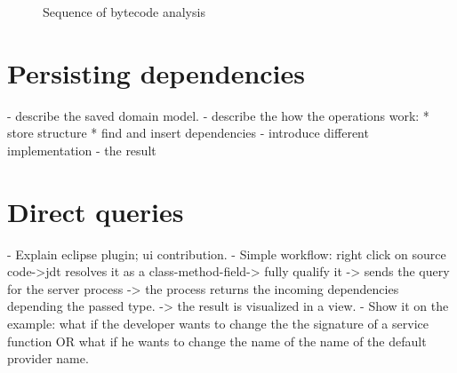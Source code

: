 \begin{figure}[htb]
   \center   
   \caption{Sequence of bytecode analysis} 
   \label{fig:analization.pdf}  
\end{figure}

\section{Persisting dependencies} 
- describe the saved domain model.
- describe the how the operations work:
 * store structure
 * find and insert dependencies
- introduce different implementation 
- the result 

\section{Direct queries}
- Explain eclipse plugin; ui contribution.
- Simple workflow: right click on source code->jdt resolves it as a
class-method-field-> fully qualify it -> sends the query for the server process
-> the process returns the incoming dependencies depending the passed type. ->
the result is visualized in a view.
- Show it on the example: what if the developer wants to change the the
signature of a service function OR what if he wants to change the name of the
name of the default provider name.

